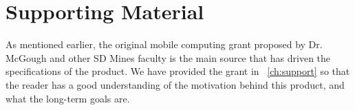 \section{Supporting Material}


As mentioned earlier, the original mobile computing grant proposed by Dr.
McGough and other SD Mines faculty is the main source that has driven the
specifications of the product. We have provided the grant in
~\autoref{ch:support} so that the reader has a good understanding of the
motivation behind this product, and what the long-term goals are.

